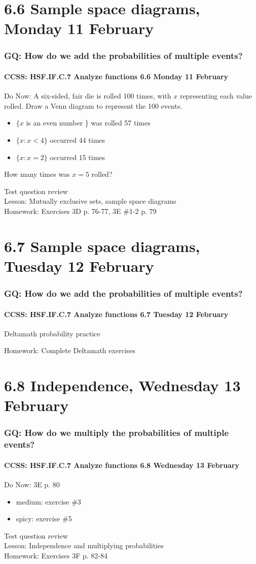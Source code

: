 \documentclass{beamer}
\begin{document}
\section{6.6 Sample space diagrams, Monday 11 February}
  \frame
  {
    \frametitle{GQ: How do we add the probabilities of multiple events?}
    \framesubtitle{CCSS: HSF.IF.C.7 Analyze functions \hfill \alert{6.6 Monday 11 February}}

    \begin{block}{Do Now: A six-sided, fair die is rolled 100 times, with $x$ representing each value rolled. Draw a Venn diagram to represent the 100 events.}
      \begin{itemize}
        \item $\{x$ is an even number \} was rolled 57 times
        \item $\{x: x <4\}$ occurred 44 times
        \item $\{x: x =2\}$ occurred 15 times
      \end{itemize}
      How many times was $x=5$ rolled?
    \end{block}
    Test question review\\
    Lesson: Mutually exclusive sets, sample space diagrams\\[0.5cm]
    Homework: Exercises 3D p. 76-77, 3E \#1-2 p. 79
  }

\section{6.7 Sample space diagrams, Tuesday 12 February}
  \frame
  {
    \frametitle{GQ: How do we add the probabilities of multiple events?}
    \framesubtitle{CCSS: HSF.IF.C.7 Analyze functions \hfill \alert{6.7 Tuesday 12 February}}

    \begin{block}{Deltamath probability practice}
    \end{block}
    Homework: Complete Deltamath exercises
  }

\section{6.8 Independence, Wednesday 13 February}
  \frame
  {
    \frametitle{GQ: How do we multiply the probabilities of multiple events?}
    \framesubtitle{CCSS: HSF.IF.C.7 Analyze functions \hfill \alert{6.8 Wednesday 13 February}}

    \begin{block}{Do Now: 3E p. 80}
      \begin{itemize}
        \item medium: exercise \#3
        \item spicy: exercise \#5
      \end{itemize}
    \end{block}
    Test question review\\
    Lesson: Independence and multiplying probabilities\\[0.5cm]
    Homework: Exercises 3F p. 82-84
  }
\end{document}
